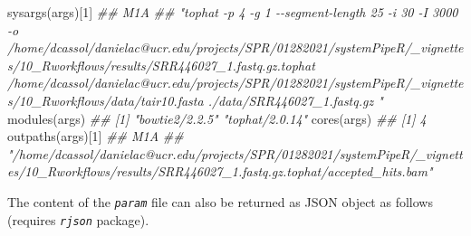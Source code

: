 \documentclass[14pt,]{article}
\newcommand{\hlnum}[1]{\textcolor[rgb]{0.816,0.125,0.439}{#1}}%
\newcommand{\hlcom}[1]{\textcolor[rgb]{0.502,0.502,0.502}{\textit{#1}}}%
\newcommand{\hlstd}[1]{\textcolor[rgb]{0.251,0.251,0.251}{#1}}%
\newenvironment{Shaded}{\begin{myshaded}}{\end{myshaded}}
\newcommand{\DecValTok}[1]{\hlnum{#1}}
\newcommand{\DocumentationTok}[1]{\hlcom{#1}}
\newcommand{\FunctionTok}[1]{\hlstd{#1}}
\newcommand{\NormalTok}[1]{\hlstd{#1}}
\begin{document}
\begin{Shaded}
\begin{Highlighting}[]
\FunctionTok{sysargs}\NormalTok{(args)[}\DecValTok{1}\NormalTok{]}
\DocumentationTok{\#\#                                                                                                                                                                                                                                                                                                                            M1A }
\DocumentationTok{\#\# "tophat {-}p 4 {-}g 1 {-}{-}segment{-}length 25 {-}i 30 {-}I 3000 {-}o /home/dcassol/danielac@ucr.edu/projects/SPR/01282021/systemPipeR/\_vignettes/10\_Rworkflows/results/SRR446027\_1.fastq.gz.tophat /home/dcassol/danielac@ucr.edu/projects/SPR/01282021/systemPipeR/\_vignettes/10\_Rworkflows/data/tair10.fasta ./data/SRR446027\_1.fastq.gz "}
\FunctionTok{modules}\NormalTok{(args)}
\DocumentationTok{\#\# [1] "bowtie2/2.2.5" "tophat/2.0.14"}
\FunctionTok{cores}\NormalTok{(args)}
\DocumentationTok{\#\# [1] 4}
\FunctionTok{outpaths}\NormalTok{(args)[}\DecValTok{1}\NormalTok{]}
\DocumentationTok{\#\#                                                                                                                                               M1A }
\DocumentationTok{\#\# "/home/dcassol/danielac@ucr.edu/projects/SPR/01282021/systemPipeR/\_vignettes/10\_Rworkflows/results/SRR446027\_1.fastq.gz.tophat/accepted\_hits.bam"}
\end{Highlighting}
\end{Shaded}

The content of the \emph{\texttt{param}} file can also be returned as JSON object as follows (requires \emph{\texttt{rjson}} package).
\end{document}
